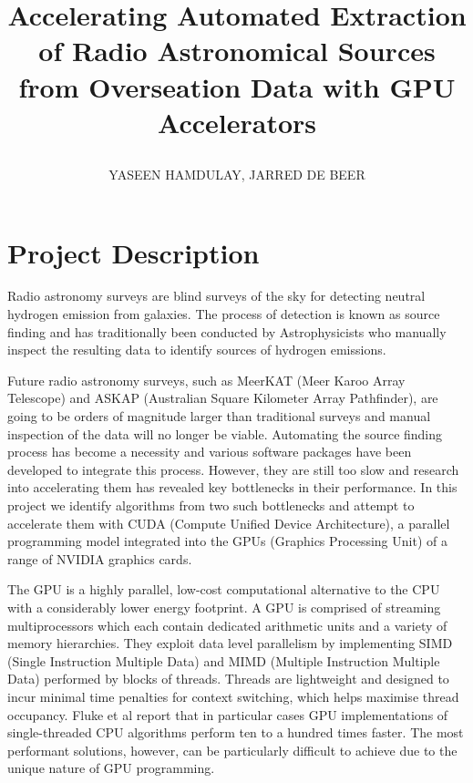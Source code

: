 \documentclass[prodmode,acmtecs]{acmsmall} \usepackage[ruled]{algorithm2e}
\begin{document}
\title{Accelerating Automated Extraction of Radio Astronomical Sources from Overseation Data with GPU Accelerators
\author{YASEEN HAMDULAY, JARRED DE BEER}
}

\maketitle{}

\section{Project Description}


Radio astronomy surveys are blind surveys of the sky for detecting neutral hydrogen emission from galaxies. The process of detection is known as source finding and has traditionally been conducted by Astrophysicists who manually inspect the resulting data to identify sources of hydrogen emissions.


Future radio astronomy surveys, such as MeerKAT (Meer Karoo Array Telescope) and ASKAP (Australian Square Kilometer Array Pathfinder), are going to be orders of magnitude larger than traditional surveys and manual inspection of the data will no longer be viable. Automating the source finding process has become a necessity and various software packages have been developed to integrate this process. However, they are still too slow and research into accelerating them has revealed key
bottlenecks in their performance. In this project we identify algorithms from two such bottlenecks and attempt to accelerate them with CUDA (Compute Unified Device Architecture), a parallel programming model integrated into the GPUs (Graphics Processing Unit) of a range of NVIDIA graphics cards.


The GPU is a highly parallel, low-cost computational alternative to the CPU with a considerably lower energy footprint. A GPU is comprised of streaming multiprocessors which each contain dedicated arithmetic units and a variety of memory hierarchies. They exploit data level parallelism by implementing SIMD (Single Instruction Multiple Data) and MIMD (Multiple Instruction Multiple Data) performed by blocks of threads. Threads are lightweight and designed to incur minimal time penalties for
context switching, which helps maximise thread occupancy.\cite{fluke2011astrophysical} Fluke et al report that in particular cases GPU implementations of single-threaded CPU algorithms perform ten to a hundred times faster. The most performant solutions, however, can be particularly difficult to achieve due to the unique nature of GPU programming.
\end{document}
